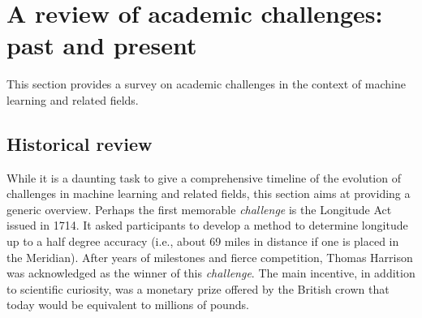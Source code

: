 \documentclass[twoside,11pt]{article}
\begin{document}
\section{A review of academic challenges: past and present}
\label{sec:pastpresent}
This section provides a survey on academic challenges in the context of machine learning and related fields. 

\subsection{Historical review}
\label{sec:historicalreview}



While it is a daunting task to give a comprehensive timeline of the evolution of challenges in machine learning and related fields, this section aims at providing a generic overview. Perhaps the first memorable \emph{challenge} is the Longitude Act issued in 1714. It asked participants to develop a method to determine longitude up to a half degree accuracy (i.e., about 69 miles in distance if one is placed in the Meridian). After years of milestones and fierce competition, Thomas Harrison was acknowledged as the winner of this \emph{challenge}. The main incentive, in addition to scientific curiosity, was a monetary prize offered by the British crown that today would be equivalent to millions of pounds. 
\end{document}
